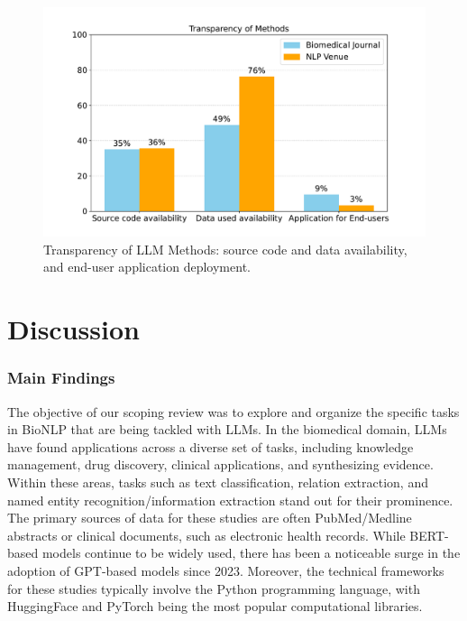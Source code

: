 \documentclass[fleqn,10pt]{olplainarticle}
\begin{document}
\begin{figure}[!ht]
\begin{center}
\includegraphics[scale=0.35]{visuals/new_pdf/rs_transparency_overview_2024.pdf} %
\caption{Transparency of LLM Methods: source code and data availability, and end-user application deployment.}
\label{fig:rs_transparency_overview}
\end{center}
\end{figure}

\section*{Discussion}
\label{sec:discussion}
\subsubsection*{Main Findings}
The objective of our scoping review was to explore and organize the specific tasks in BioNLP that are being tackled with LLMs. In the biomedical domain, LLMs have found applications across a diverse set of tasks, including knowledge management, drug discovery, clinical applications, and synthesizing evidence. Within these areas, tasks such as text classification, relation extraction, and named entity recognition/information extraction stand out for their prominence. The primary sources of data for these studies are often PubMed/Medline abstracts or clinical documents, such as electronic health records. While BERT-based models continue to be widely used, there has been a noticeable surge in the adoption of GPT-based models since 2023. Moreover, the technical frameworks for these studies typically involve the Python programming language, with HuggingFace and PyTorch being the most popular computational libraries.
\end{document}

